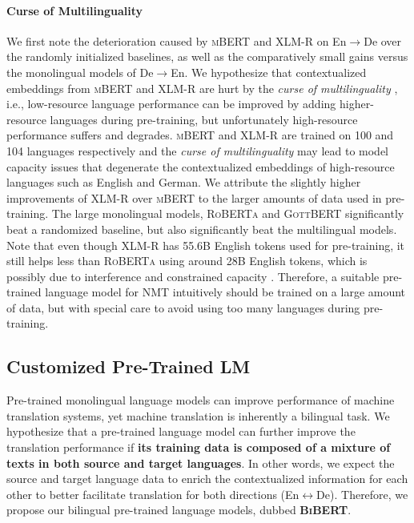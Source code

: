 \documentclass[11pt]{article}
\begin{document}
\paragraph{Curse of Multilinguality}
We first note the deterioration caused by \textsc{mBERT} and \textsc{XLM-R} on En$\rightarrow$De over the randomly initialized baselines, as well as the comparatively small gains versus the monolingual models of De$\rightarrow$En. We hypothesize that contextualized embeddings from \textsc{mBERT} and \textsc{XLM-R} are hurt by the \textit{curse of multilinguality} \citep{conneau2020unsupervised}, i.e., low-resource language performance can be improved by adding higher-resource languages during pre-training, but unfortunately high-resource performance suffers and degrades. \textsc{mBERT} and \textsc{XLM-R} are trained on 100 and 104 languages respectively and the \textit{curse of multilinguality} may lead to model capacity issues that degenerate the contextualized embeddings of high-resource languages such as English and German. We attribute the slightly higher improvements of \textsc{XLM-R} over \textsc{mBERT} to the larger amounts of data used in pre-training. The large monolingual models, \textsc{RoBERTa} and \textsc{GottBERT} significantly beat a randomized baseline, but also significantly beat the multilingual models. Note that even though \textsc{XLM-R} has 55.6B English tokens used for pre-training, it still helps less than \textsc{RoBERTa} using around 28B English tokens, which is possibly due to interference and constrained capacity \citep{arivazhagan2019massively, johnson2017google, tan2019multilingual}. Therefore, a suitable pre-trained language model for NMT intuitively should be trained on a large amount of data, but with special care to avoid using too many languages during pre-training. 



\subsection{Customized Pre-Trained LM}
Pre-trained monolingual language models can improve performance of machine translation systems, yet machine translation is inherently a bilingual task. 
We hypothesize that a pre-trained language model can further improve the translation performance if \textbf{its training data is composed of a mixture of texts in both source and target languages}. In other words, we expect the source and target language data to enrich the contextualized information for each other to better facilitate translation for both directions (En$\leftrightarrow$De). Therefore, we propose our bilingual pre-trained language models, dubbed \textbf{\textsc{BiBERT}}. 
\end{document}

